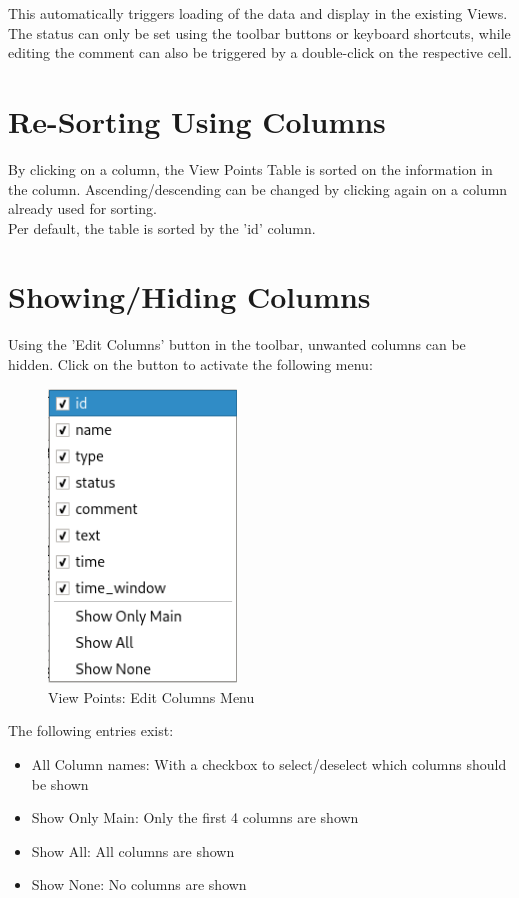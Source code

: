 This automatically triggers loading of the data and display in the existing Views. \\

The status can only be set using the toolbar buttons or keyboard shortcuts, while editing the comment can also be triggered by a double-click on the respective cell.

\section{Re-Sorting Using Columns}

By clicking on a column, the View Points Table is sorted on the information in the column. Ascending/descending can be changed by clicking again on a column already used for sorting. \\

Per default, the table is sorted by the 'id' column.

\section{Showing/Hiding Columns}

Using the 'Edit Columns' button in the toolbar, unwanted columns can be hidden. Click on the button to activate the following menu:

\begin{figure}[H]
  \centering 
    \includegraphics[width=5cm,frame]{figures/view_points_edit_columns.png}
  \caption{View Points: Edit Columns Menu}
\end{figure}

The following entries exist:

\begin{itemize}  
\item All Column names: With a checkbox to select/deselect which columns should be shown
\item Show Only Main: Only the first 4 columns are shown
\item Show All: All columns are shown
\item Show None: No columns are shown
\end{itemize}
\ \\

